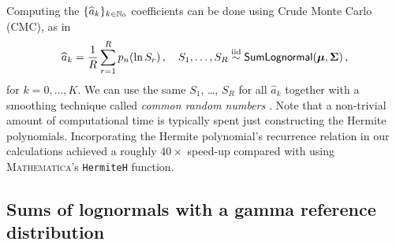 

Computing the $\{ \widehat{a}_k \}_{k \in \mathbb{N}_0}$ coefficients can be done using Crude Monte Carlo (CMC), as in
\[ \widehat{a}_k = \frac1R \sum_{r=1}^R p_n(\ln S_r) \,, \quad S_1, \dots, S_R \overset{\smash{\mathrm{iid}}}{\sim} \mathsf{SumLognormal}(\bm{\mu}, \bm{\Sigma}) \,, \]
for $k = 0, \dots, K$. We can use the same $S_1$, \dots, $S_R$ for all $\widehat{a}_k$ together with a smoothing technique called \emph{common random numbers} \cite{asmussen2007stochastic,glasserman2003monte}. Note that a non-trivial amount of computational time is typically spent just constructing the Hermite polynomials. Incorporating the Hermite polynomial's recurrence relation in our calculations achieved a roughly $40\times$ speed-up compared with using \textsc{Mathematica}'s \texttt{HermiteH} function.

\subsection{Sums of lognormals with a gamma reference distribution} \label{SS:LNGammaNu}

